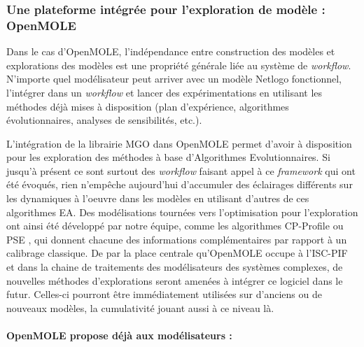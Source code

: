 \subsubsection{Une plateforme intégrée pour l'exploration de modèle : OpenMOLE}


Dans le cas d'OpenMOLE, l'indépendance entre construction des modèles et explorations des modèles est une propriété générale liée au système de \textit{workflow}. N'importe quel modélisateur peut arriver avec un modèle Netlogo fonctionnel, l'intégrer dans un \textit{workflow} et lancer des expérimentations en utilisant les méthodes déjà mises à disposition (plan d'expérience, algorithmes évolutionnaires, analyses de sensibilités, etc.).

L'intégration de la librairie MGO dans OpenMOLE permet d'avoir à disposition pour les exploration des méthodes à base d'Algorithmes Evolutionnaires. Si jusqu'à présent ce sont surtout des \textit{workflow} faisant appel à ce \textit{framework} qui ont été évoqués, rien n'empêche aujourd'hui d'accumuler des éclairages différents sur les dynamiques à l'oeuvre dans les modèles en utilisant d'autres de ces algorithmes EA.  Des modélisations tournées vers l'optimisation pour l'exploration ont ainsi été développé par notre équipe, comme les algorithmes CP-Profile \autocite{Reuillon2015} ou PSE \autocite{Cherel2015}, qui donnent chacune des informations complémentaires par rapport à un calibrage classique. De par la place centrale qu'OpenMOLE occupe à l'ISC-PIF et dans la chaine de traitements des modélisateurs des systèmes complexes, de nouvelles méthodes d'explorations seront amenées à intégrer ce logiciel dans le futur. Celles-ci pourront être immédiatement utilisées sur d'anciens ou de nouveaux modèles, la cumulativité jouant aussi à ce niveau là.

\paragraph{OpenMOLE propose déjà aux modélisateurs :}

